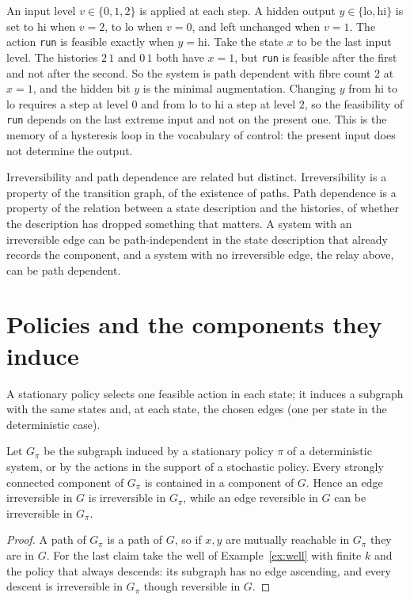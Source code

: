 \begin{example}\label{ex:relay}
An input level $v\in\{0,1,2\}$ is applied at each step. A hidden output $y\in\{\mathrm{lo},\mathrm{hi}\}$ is set to hi when $v=2$, to lo when $v=0$, and left unchanged when $v=1$. The action \texttt{run} is feasible exactly when $y=\mathrm{hi}$. Take the state $x$ to be the last input level. The histories $2\,1$ and $0\,1$ both have $x=1$, but \texttt{run} is feasible after the first and not after the second. So the system is path dependent with fibre count $2$ at $x=1$, and the hidden bit $y$ is the minimal augmentation. Changing $y$ from hi to lo requires a step at level $0$ and from lo to hi a step at level $2$, so the feasibility of \texttt{run} depends on the last extreme input and not on the present one. This is the memory of a hysteresis loop in the vocabulary of control: the present input does not determine the output.
\end{example}

Irreversibility and path dependence are related but distinct. Irreversibility is a property of the transition graph, of the existence of paths. Path dependence is a property of the relation between a state description and the histories, of whether the description has dropped something that matters. A system with an irreversible edge can be path-independent in the state description that already records the component, and a system with no irreversible edge, the relay above, can be path dependent.

\section{Policies and the components they induce}

A stationary policy selects one feasible action in each state; it induces a subgraph with the same states and, at each state, the chosen edges (one per state in the deterministic case).

\begin{newresult}\label{prop:policy-sccs}
Let $G_\pi$ be the subgraph induced by a stationary policy $\pi$ of a deterministic system, or by the actions in the support of a stochastic policy. Every strongly connected component of $G_\pi$ is contained in a component of $G$. Hence an edge irreversible in $G$ is irreversible in $G_\pi$, while an edge reversible in $G$ can be irreversible in $G_\pi$.
\end{newresult}
\begin{proof}
A path of $G_\pi$ is a path of $G$, so if $x,y$ are mutually reachable in $G_\pi$ they are in $G$. For the last claim take the well of Example~\ref{ex:well} with finite $k$ and the policy that always descends: its subgraph has no edge ascending, and every descent is irreversible in $G_\pi$ though reversible in $G$.
\end{proof}

